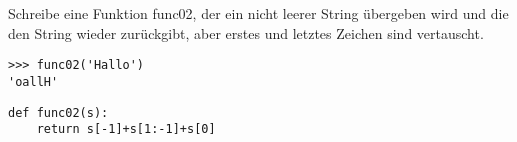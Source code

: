 \question[3] Schreibe eine Funktion func02, der ein nicht leerer String übergeben wird
und die den String wieder zurückgibt, aber erstes und letztes Zeichen sind vertauscht.
\begin{lstlisting}
>>> func02('Hallo')
'oallH'
\end{lstlisting}
\begin{solutionbox}{4cm}
\begin{lstlisting}
def func02(s):
    return s[-1]+s[1:-1]+s[0]
\end{lstlisting}
\end{solutionbox}
